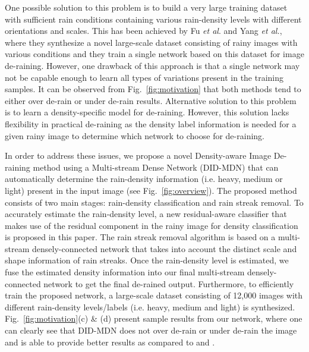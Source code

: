 \documentclass[10pt,twocolumn,letterpaper]{article}
\begin{document}
One possible solution to this problem is to build a very large training dataset with sufficient rain conditions containing various rain-density levels with different orientations and scales.    This has been achieved by Fu \emph{et al}. \cite{derain_cvpr2017} and Yang \emph{et al.}\cite{derain_cvpr2017_multi}, where they synthesize a  novel  large-scale dataset consisting of rainy images with various conditions and they train a single network based on this dataset for image de-raining.  
 However, one drawback of this approach is that a single network may not be capable enough  to learn all types of variations present in the training samples.  It can be observed from Fig.~\ref{fig:motivation} that both methods tend to either over de-rain or under de-rain results.  Alternative solution to this problem is to  learn a density-specific model for de-raining. However,  this solution lacks flexibility in practical de-raining as the density label information is needed  for a given rainy image to determine which network to choose for de-raining.
 


In order to address these issues, we propose a novel Density-aware Image De-raining method using a Multi-stream Dense Network (DID-MDN) that can automatically determine the rain-density information (i.e. heavy, medium or light) present in the input image (see Fig.~\ref{fig:overview}).   The proposed method consists of two main stages: rain-density classification and rain streak removal.  To accurately estimate the  rain-density  level,  a new  residual-aware classifier that makes use of the residual component in the rainy image for density classification is proposed in this paper.  The rain streak removal algorithm is based on a multi-stream densely-connected network that takes into account the distinct scale and shape information of rain streaks.  Once the rain-density level is estimated, we fuse the estimated density information into our final multi-stream densely-connected network to get the final de-rained output.  Furthermore, to efficiently train the proposed network, a large-scale dataset consisting of 12,000 images with different  rain-density levels/labels (i.e. heavy, medium and light) is synthesized.  Fig.~\ref{fig:motivation}(c) \& (d) present sample results from our network, where one can clearly see that DID-MDN does not over de-rain or under de-rain the image and is able to provide better results as compared to \cite{derain_cvpr2017} and \cite{derain_cvpr2017_multi}. 
\end{document}
